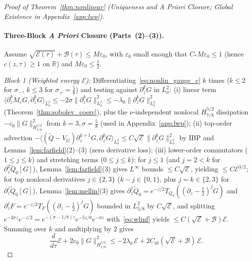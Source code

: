\documentclass[11pt,a4paper]{article}
\begin{document}
\begin{proof}[Proof of Theorem~\ref{thm:nonlinear} (Uniqueness and \emph{A Priori} Closure; Global Existence in Appendix~\ref{app:lwp})]
\paragraph{Three-Block \emph{A Priori} Closure (Parts~(2)--(3)).}
Assume $\sqrt{\mathcal{E}(\tau)} + \mathcal{B}(\tau) \le M\varepsilon_0$, with $\varepsilon_0$ small enough that $C_* M\varepsilon_0 \le 1$ (hence $c(z,\tau) \ge 1$ on $\mathbb{R}$) and $M\varepsilon_0 \le \frac{1}{2}$.

\emph{Block 1 (Weighted energy $\mathcal{E}$):} Differentiating~\eqref{eq:nonlin_gauge_c} $k$ times ($k\le 2$ for $\sigma_-$, $k\le 3$ for $\sigma_+ = \frac{5}{8}$) and testing against $\partial_z^k G$ in $L^2_\sigma$:
(i) linear term $\langle \partial_z^k M_c G, \partial_z^k G\rangle_{L^2_\sigma} \le -2\sigma\|\partial_z^k G\|_{L^2_\sigma}^2 \le -\lambda_0\|\partial_z^k G\|_{L^2_\sigma}^2$ (Theorem~\ref{thm:sobolev_coerc}), plus the $\nu$-independent nonlocal $H^{5/2}_{7/8}$ dissipation $-c_0\|G\|_{H^{5/2}_{7/8}}^2$ from $k=3, \sigma=\frac{5}{8}$ (used in Appendix~\ref{app:lwp});
(ii) top-order advection $-\langle (\widetilde{Q}-V_G)\partial_z^{k+1}G, \partial_z^k G\rangle_{L^2_\sigma} \le C\sqrt{\mathcal{E}}\|\partial_z^k G\|_{L^2_\sigma}^2$ by IBP and Lemma~\ref{lem:farfield}(2)--(3) (zero derivative loss);
(iii) lower-order commutators ($1\le j\le k$) and stretching terms ($0\le j\le k$): for $j \le 1$ (and $j=2 < k$ for $\partial_z^2\widetilde{Q}_0[G]$), Lemma~\ref{lem:farfield}(3) gives $L^\infty$ bounds $\le C\sqrt{\mathcal{E}}$, yielding $\le C\mathcal{E}^{3/2}$; for top nonlocal derivatives $j \in \{2,3\}$ ($k-j \in \{0,1\}$, plus $j = k \in \{2,3\}$ for $\partial_z^j\widetilde{Q}_0[G]$), Lemma~\ref{lem:mellin}(3) gives $\partial_z^j\widetilde{Q}_0 = e^{-z/2}T_{Q_0}((\partial_z-\frac{1}{2})^j G)$ and $\partial_z^j F = e^{-z/2}T_F((\partial_z-\frac{1}{2})^j G)$ bounded in $L^2_{5/8}$ by $C\sqrt{\mathcal{E}}$, and splitting $e^{-2\sigma z}e^{-z/2} = e^{-(\sigma-1/8)z}e^{-5z/8}e^{-\sigma z}$ with~\eqref{eq:wlinf} yields $\le C(\sqrt{\mathcal{E}}+\mathcal{B})\mathcal{E}$. Summing over $k$ and multiplying by $2$ gives
\begin{equation}\label{eq:block1}
\frac{d}{d\tau}\mathcal{E} + 2 c_0\|G\|_{H^{5/2}_{7/8}}^2 \le -2\lambda_0\,\mathcal{E} + 2 C_{\mathrm{nl}}(\sqrt{\mathcal{E}} + \mathcal{B})\,\mathcal{E}.
\end{equation}


\end{proof}
\end{document}
